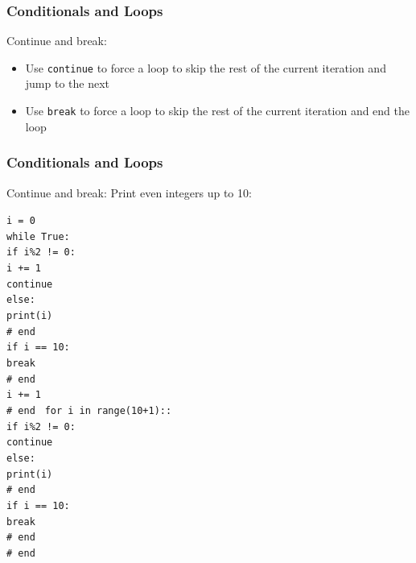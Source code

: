 \documentclass{beamer}
\newcommand{\code}[1]{\texttt{#1}}
\newcommand{\tab}{\hspace*{22pt}}
\begin{document}
\begin{frame}%
	\frametitle{Conditionals and Loops}
	
	\begin{alertblock}{Continue and break:}
		\begin{itemize}
			\item Use \code{continue} to force a loop to skip the rest of the current iteration and jump to the next
			\item Use \code{break} to force a loop to skip the rest of the current iteration and end the loop
		\end{itemize}
	\end{alertblock}
	
\end{frame}

\begin{frame}%
	\frametitle{Conditionals and Loops}
	
	\begin{alertblock}{Continue and break:}
		Print even integers up to 10:
		
		\vspace{10pt}
		
			\code{i = 0 \\
				while True: \\
				\tab if i\%2 != 0: \\
				\tab \tab i += 1 \\
				\tab \tab continue \\
				\tab else: \\
				\tab \tab print(i) \\
				\tab \# end \\
				\tab if i == 10: \\
				\tab \tab break \\
				\tab \# end \\
				\tab i += 1 \\
				\# end}
		\endminipage\hfill
			\code{
				for i in range(10+1):: \\
				\tab if i\%2 != 0: \\
				\tab \tab continue \\
				\tab else: \\
				\tab \tab print(i) \\
				\tab \# end \\
				\tab if i == 10: \\
				\tab \tab break \\
				\tab \# end \\
				\# end}
		\endminipage\hfill
	\end{alertblock}
	
\end{frame}
\end{document}
